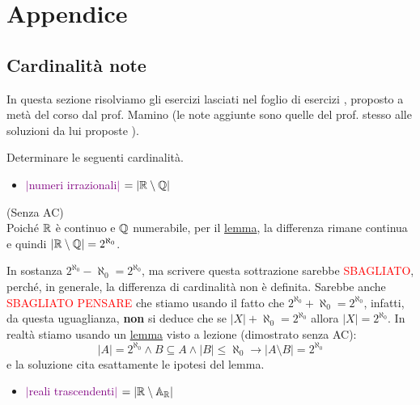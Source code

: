 \section{Appendice}
\subsection{Cardinalit\`a note}
In questa sezione risolviamo gli esercizi lasciati nel foglio di esercizi \cite{mamino_eti_22_23_esercizi}, proposto a met\`a del corso dal prof. Mamino (le note aggiunte sono quelle del prof. stesso alle soluzioni da lui proposte \cite{mamino_eti_22_23_sol_esercizi}).

\begin{exercise}
	Determinare le seguenti cardinalit\`a.
\end{exercise}

\begin{itemize}
	\item \textcolor{purple}{$|$numeri irrazionali$|$ $= |\mathbb R \setminus \mathbb Q|$}
\end{itemize}

\begin{soln}
	(Senza AC)\\
	Poich\'e $\mathbb R$ \`e continuo e $\mathbb Q$ numerabile, per il \hyperref[continuo-numerabile]{lemma}, la differenza rimane continua e quindi $|\mathbb R \setminus \mathbb Q| = 2^{\aleph_0}$.
\end{soln}

\begin{note}
	In sostanza $2^{\aleph_0} - \aleph_0 = 2^{\aleph_0}$, ma scrivere questa sottrazione sarebbe \textcolor{red}{SBAGLIATO}, perch\'e, in generale, la differenza di cardinalit\`a non \`e definita. Sarebbe anche \textcolor{red}{SBAGLIATO PENSARE}
	che stiamo usando il fatto che $2^{\aleph_0} + \aleph_0 = 2^{\aleph_0}$, infatti, da questa uguaglianza, \textbf{non} si deduce che se $|X| + \aleph_0 = 2^{\aleph_0}$ allora $|X| = 2^{\aleph_0}$.
	In realt\`a stiamo usando un \hyperref[continuo-numerabile]{lemma} visto a lezione (dimostrato senza AC):
	\[ |A| = 2^{\aleph_0} \land B \subseteq A \land |B| \leq \aleph_0 \rightarrow |A \setminus B| = 2^{\aleph_0}
 		\]
	e la soluzione cita esattamente le ipotesi del lemma.
\end{note}

\begin{itemize}
	\item \textcolor{purple}{$|$reali trascendenti$|$ $= |\mathbb R \setminus \mathbb{A}_{\mathbb R}|$}
\end{itemize}

